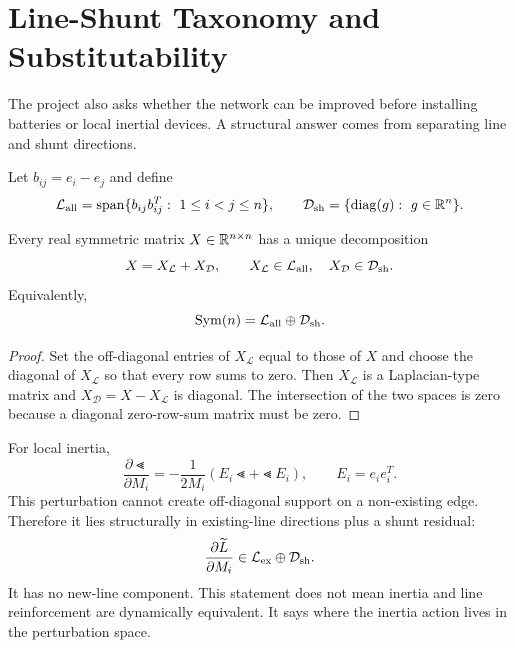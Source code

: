 \section{Line-Shunt Taxonomy and Substitutability}

The project also asks whether the network can be improved before installing
batteries or local inertial devices. A structural answer comes from separating
line and shunt directions.

Let \(b_{ij}=e_i-e_j\) and define
\begin{equation}
  \mathcal L_{\rm all}
  =
  \operatorname{span}\{b_{ij}b_{ij}^T:\ 1\le i<j\le n\},
  \qquad
  \mathcal D_{\rm sh}
  =
  \{\operatorname{diag}(g):\ g\in\mathbb{R}^n\}.
  \label{eq:line_shunt_spaces}
\end{equation}

\begin{theorem}
Every real symmetric matrix \(X\in\mathbb{R}^{n\times n}\) has a unique decomposition
\begin{equation}
  X=X_{\mathcal L}+X_{\mathcal D},
  \qquad
  X_{\mathcal L}\in\mathcal L_{\rm all},\quad
  X_{\mathcal D}\in\mathcal D_{\rm sh}.
  \label{eq:line_shunt_decomposition}
\end{equation}
Equivalently,
\[
  \operatorname{Sym}(n)=\mathcal L_{\rm all}\oplus\mathcal D_{\rm sh}.
\]
\end{theorem}

\begin{proof}
Set the off-diagonal entries of \(X_{\mathcal L}\) equal to those of \(X\) and
choose the diagonal of \(X_{\mathcal L}\) so that every row sums to zero. Then
\(X_{\mathcal L}\) is a Laplacian-type matrix and
\(X_{\mathcal D}=X-X_{\mathcal L}\) is diagonal. The intersection of the two
spaces is zero because a diagonal zero-row-sum matrix must be zero.
\end{proof}

For local inertia,
\begin{equation}
  \frac{\partial\Lt}{\partial M_i}
  =
  -\frac{1}{2M_i}
  \left(E_i\Lt+\Lt E_i\right),
  \qquad
  E_i=e_ie_i^T.
  \label{eq:local_inertia_operator_location}
\end{equation}
This perturbation cannot create off-diagonal support on a non-existing edge.
Therefore it lies structurally in existing-line directions plus a shunt
residual:
\begin{equation}
  \frac{\partial\widetilde L}{\partial M_i}
  \in
  \mathcal L_{\rm ex}\oplus\mathcal D_{\rm sh}.
  \label{eq:inertia_existing_shunt}
\end{equation}
It has no new-line component. This statement does not mean inertia and line
reinforcement are dynamically equivalent. It says where the inertia action
lives in the perturbation space.

